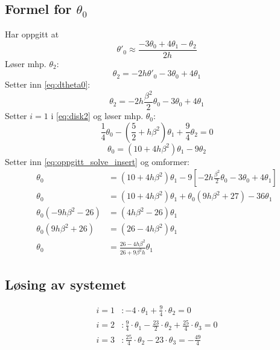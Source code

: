 \subsection{Formel for $\theta_0$} %
\label{sub:formel_for_theta_0}
Har oppgitt at
\begin{equation}
  \theta'_0 \approx \frac{-3\theta_0 + 4\theta_{1} - \theta_{2}}{2h} \label{eq:oppgitt}
\end{equation}
Løser mhp. $\theta_2$:
\begin{equation}
  \theta_2 = - 2h\theta'_0 - 3\theta_0 + 4\theta_1 \label{eq:oppgitt_solve}
\end{equation}
Setter inn \eqref{eq:dtheta0}:
\begin{equation}
  \theta_2 = - 2h \frac{\beta^2}{2}\theta_0 - 3\theta_0 + 4\theta_1 \label{eq:oppgitt_solve_insert}
\end{equation}
Setter $i=1$ i \eqref{eq:disk2} og løser mhp. $\theta_0$:
\begin{equation}
  \nonumber
  \frac{1}{4}\theta_0 - \left( \frac{5}{2} + h\beta^2 \right) \theta_1 + \frac{9}{4} \theta_2 = 0
\end{equation}
\begin{equation}
  \theta_0 = \left( 10 + 4h\beta^2 \right) \theta_1 - 9 \theta_2  \label{eq:disk2_i_1}
\end{equation}
Setter inn \eqref{eq:oppgitt_solve_insert} og omformer:
\begin{align*}
  \theta_0 &= \left( 10 + 4h\beta^2 \right) \theta_1 - 9 \left[ -2h \frac{\beta^2}{2}\theta_0 - 3\theta_0 + 4\theta_1  \right] \\
  \theta_0 &= \left( 10 + 4h\beta^2 \right) \theta_1 + \theta_0(9h \beta^2 + 27) - 36\theta_1 \\
  \theta_0(-9h \beta^2 - 26)&= \left(4h\beta^2 -26 \right) \theta_1 \\
  \theta_0(9h \beta^2 + 26) &= \left( 26 - 4h\beta^2 \right) \theta_1 \\
  \theta_0 &= \frac{26 - 4h\beta^2}{26 + 9\beta^2h} \theta_1
\end{align*}


\subsection{Løsing av systemet} %
\label{sub:l_sing_av_systemet}

\begin{align*}
  i=1 &: - 4 \cdot \theta_1 + \frac{9}{4} \cdot \theta_{2} = 0 \\
  i=2 &: \frac{9}{4}\cdot\theta_{1} - \frac{23}{2} \cdot \theta_2+\frac{25}{4}\cdot\theta_3 = 0 \\
  i=3 &: \frac{25}{4} \cdot \theta_2 - 23 \cdot \theta_3 = - \frac{49}{4}
\end{align*}


